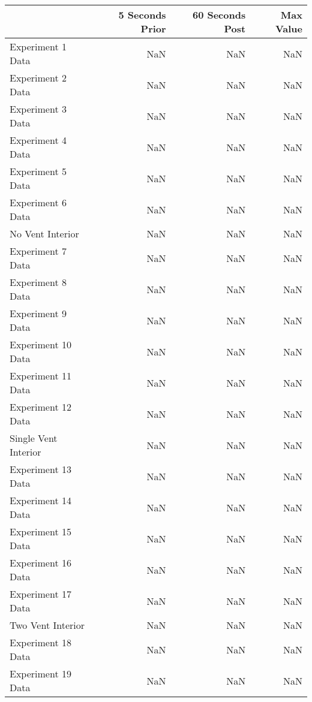 \begin{tabular}{lrrr}
\toprule
{} &  5 Seconds Prior &  60 Seconds Post &  Max Value \\
\midrule
Experiment 1 Data    &              NaN &              NaN &        NaN \\
Experiment 2 Data    &              NaN &              NaN &        NaN \\
Experiment 3 Data    &              NaN &              NaN &        NaN \\
Experiment 4 Data    &              NaN &              NaN &        NaN \\
Experiment 5 Data    &              NaN &              NaN &        NaN \\
Experiment 6 Data    &              NaN &              NaN &        NaN \\
No Vent Interior     &              NaN &              NaN &        NaN \\
Experiment 7 Data    &              NaN &              NaN &        NaN \\
Experiment 8 Data    &              NaN &              NaN &        NaN \\
Experiment 9 Data    &              NaN &              NaN &        NaN \\
Experiment 10 Data   &              NaN &              NaN &        NaN \\
Experiment 11 Data   &              NaN &              NaN &        NaN \\
Experiment 12 Data   &              NaN &              NaN &        NaN \\
Single Vent Interior &              NaN &              NaN &        NaN \\
Experiment 13 Data   &              NaN &              NaN &        NaN \\
Experiment 14 Data   &              NaN &              NaN &        NaN \\
Experiment 15 Data   &              NaN &              NaN &        NaN \\
Experiment 16 Data   &              NaN &              NaN &        NaN \\
Experiment 17 Data   &              NaN &              NaN &        NaN \\
Two Vent Interior    &              NaN &              NaN &        NaN \\
Experiment 18 Data   &              NaN &              NaN &        NaN \\
Experiment 19 Data   &              NaN &              NaN &        NaN \\

\end{tabular}
